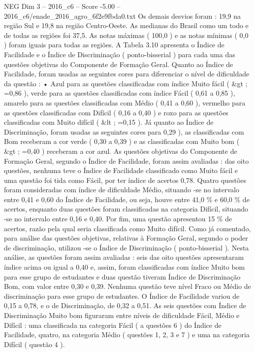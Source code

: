 \begin{textsample}{NEG Dim 3 – 2016\_c6 – Score -5.00 – 2016\_c6/enade\_2016\_agro\_6f2e9fbda0.txt}
Os demais desvios foram : 19,9 na região Sul e 19,8 na região Centro-Oeste.
As medianas do Brasil como um todo e de todas as regiões foi 37,5.
As notas máximas ( 100,0 ) e as notas mínimas ( 0,0 ) foram iguais para todas as regiões.
A Tabela 3.10 apresenta o Índice de Facilidade e o Índice de Discriminação ( ponto-bisserial ) para cada uma das questões objetivas do Componente de Formação Geral.
Quanto ao Índice de Facilidade, foram usadas as seguintes cores para diferenciar o nível de dificuldade da questão : • Azul para as questões classificadas com índice Muito fácil ( \&gt ; =0,86 ), verde para as questões classificadas com índice Fácil ( 0,61 a 0,85 ), amarelo para as questões classificadas com Médio ( 0,41 a 0,60 ), vermelho para as questões classificadas com Difícil ( 0,16 a 0,40 ) e roxo para as questões classificadas com Muito difícil ( \&lt ; =0,15 ).
Já quanto ao Índice de Discriminação, foram usadas as seguintes cores para 0,29 ), as classificadas com Bom receberam a cor verde ( 0,30 a 0,39 ) e as classificadas com Muito bom ( \&gt ; =0,40 ) receberam a cor azul.
As questões objetivas do Componente de Formação Geral, segundo o Índice de Facilidade, foram assim avaliadas : das oito questões, nenhuma teve o Índice de Facilidade classificado como Muito fácil e uma questão foi tida como Fácil, por ter índice de acertos 0,78.
Quatro questões foram consideradas com índice de dificuldade Médio, situando -se no intervalo entre 0,41 e 0,60 do Índice de Facilidade, ou seja, houve entre 41,0 \% e 60,0 \% de acertos, enquanto duas questões foram classificadas na categoria Difícil, situando -se no intervalo entre 0,16 e 0,40.
Por fim, uma questão apresentou 15 \% de acertos, razão pela qual seria classificada como Muito difícil.
Como já comentado, para análise das questões objetivas, relativas à Formação Geral, segundo o poder de discriminação, utilizou -se o Índice de Discriminação ( ponto-bisserial ).
Nesta análise, as questões foram assim avaliadas : seis das oito questões apresentaram índice acima ou igual a 0,40 e, assim, foram classificadas com índice Muito bom para esse grupo de estudantes e duas questão tiveram Índice de Discriminação Bom, com valor entre 0,30 e 0,39.
Nenhuma questão teve nível Fraco ou Médio de discriminação para esse grupo de estudantes.
O Índice de Facilidade variou de 0,15 a 0,78, e o de Discriminação, de 0,32 a 0,51.
As seis questões com Índice de Discriminação Muito bom figuraram entre níveis de dificuldade Fácil, Médio e Difícil : uma classificada na categoria Fácil ( a questões 6 ) do Índice de Facilidade, quatro, na categoria Médio ( questões 1, 2, 3 e 7 ) e uma na categoria Difícil ( questão 4 ).

\end{textsample}
